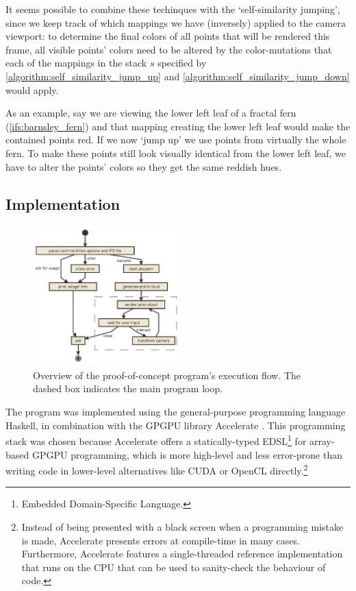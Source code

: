 \documentclass[11pt]{article}
\begin{document}
It seems possible to combine these techinques with the `self-similarity jumping', since we keep track of which mappings we have (inversely) applied to the camera viewport:
to determine the final colors of all points that will be rendered this frame, 
all visible points' colors need to be altered by the color-mutations that each of the mappings in the stack \(s\) specified by \autoref{algorithm:self_similarity_jump_up} and \autoref{algorithm:self_similarity_jump_down} would apply.

As an example, say we are viewing the lower left leaf of a fractal fern (\autoref{ifs:barnsley_fern}) and that mapping creating the lower left leaf would make the contained points red. 
If we now `jump up' we use points from virtually the whole fern.
To make these points still look visually identical from the lower left leaf, we have to alter the points' colors so they get the same reddish hues.


\subsection{Implementation}
\label{sec:org4b6676e}

\begin{figure}
  \centering
  \includegraphics[width=0.5\textwidth]{figures/program_execution}
  \caption{Overview of the proof-of-concept program's execution flow. The dashed box indicates the main program loop.}
\label{figure:program_flow}
\end{figure}

The program was implemented using the general-purpose programming language Haskell, 
in combination with the GPGPU library Accelerate \cite{chakravarty2011accelerating}.
This programming stack was chosen because Accelerate 
offers a statically-typed EDSL\footnote{Embedded Domain-Specific Language.} for array-based GPGPU programming,
which is more high-level and less error-prone than writing code 
in lower-level alternatives like CUDA or OpenCL directly.\footnote{Instead of being presented with a black screen when a programming mistake is made, 
Accelerate presents errors at compile-time in many cases. Furthermore, Accelerate features a
single-threaded reference implementation that runs on the CPU that can be used to sanity-check the behaviour of code.}
\end{document}
